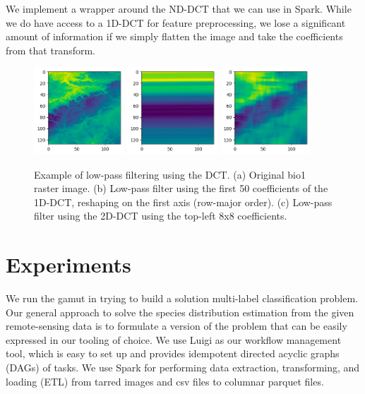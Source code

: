 \documentclass[]{style/ceurart}
\begin{document}
We implement a wrapper around the ND-DCT that we can use in Spark. 
While we do have access to a 1D-DCT for feature preprocessing, we lose a significant amount of information if we simply flatten the image and take the coefficients from that transform.

\begin{figure}
  \centering
  \includegraphics[width=0.3\textwidth]{figures/dct-original.png}
  \hfill
  \includegraphics[width=0.3\textwidth]{figures/dct-1d-lowpass.png}
  \hfill
  \includegraphics[width=0.3\textwidth]{figures/dct-2d-lowpass.png}
  \caption{
    Example of low-pass filtering using the DCT.
    (a) Original bio1 raster image.
    (b) Low-pass filter using the first 50 coefficients of the 1D-DCT, reshaping on the first axis (row-major order).
    (c) Low-pass filter using the 2D-DCT using the top-left 8x8 coefficients.
  }
  \label{fig:dct-lowpass}
\end{figure}

\section{Experiments}

We run the gamut in trying to build a solution multi-label classification problem. 
Our general approach to solve the species distribution estimation from the given remote-sensing data is to formulate a version of the problem that can be easily expressed in our tooling of choice. 
We use Luigi as our workflow management tool, which is easy to set up and provides idempotent directed acyclic graphs (DAGs) of tasks. 
We use Spark for performing data extraction, transforming, and loading (ETL) from tarred images and csv files to columnar parquet files. 
\end{document}
